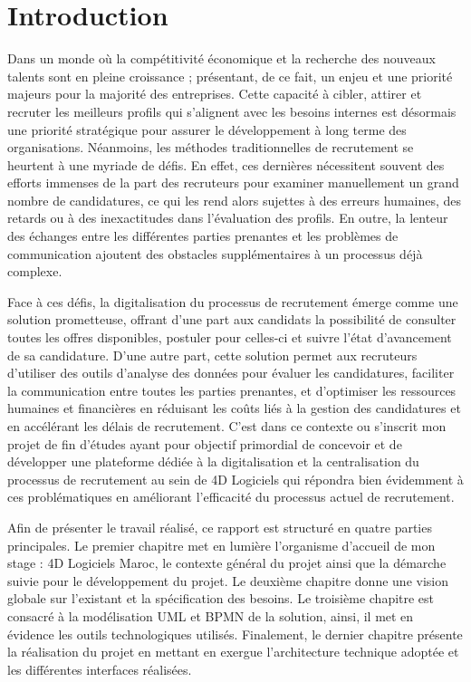 \chapter*{Introduction}
Dans un monde où la compétitivité économique et la recherche des nouveaux talents
sont en pleine croissance ; présentant, de ce fait, un enjeu et une priorité majeurs pour la
majorité des entreprises. Cette capacité à cibler, attirer et recruter les meilleurs profils qui
s’alignent avec les besoins internes est désormais une priorité stratégique pour assurer le
développement à long terme des organisations. Néanmoins, les méthodes traditionnelles de
recrutement se heurtent à une myriade de défis. En effet, ces dernières nécessitent souvent
des efforts immenses de la part des recruteurs pour examiner manuellement un grand
nombre de candidatures, ce qui les rend alors sujettes à des erreurs humaines, des retards
ou à des inexactitudes dans l’évaluation des profils. En outre, la lenteur des échanges entre
les différentes parties prenantes et les problèmes de communication ajoutent des obstacles
supplémentaires à un processus déjà complexe.
\newline

Face à ces défis, la digitalisation du processus de recrutement émerge comme une
solution prometteuse, offrant d’une part aux candidats la possibilité de consulter toutes les
offres disponibles, postuler pour celles-ci et suivre l’état d’avancement de sa candidature.
D’une autre part, cette solution permet aux recruteurs d’utiliser des outils d’analyse des
données pour évaluer les candidatures, faciliter la communication entre toutes les parties
prenantes, et d’optimiser les ressources humaines et financières en réduisant les coûts
liés à la gestion des candidatures et en accélérant les délais de recrutement. C’est dans
ce contexte ou s’inscrit mon projet de fin d’études ayant pour objectif primordial de
concevoir et de développer une plateforme dédiée à la digitalisation et la centralisation
du processus de recrutement au sein de 4D Logiciels qui répondra bien évidemment à ces
problématiques en améliorant l’efficacité du processus actuel de recrutement.  
\newline

Afin de présenter le travail réalisé, ce rapport est structuré en quatre parties principales. 
Le premier chapitre met en lumière l’organisme d’accueil de mon stage : 4D Logiciels Maroc,
 le contexte général du projet ainsi que la démarche suivie pour le développement
du projet. Le deuxième chapitre donne une vision globale sur l’existant et la spécification
des besoins. Le troisième chapitre est consacré à la modélisation UML et BPMN de la
solution, ainsi, il met en évidence les outils technologiques utilisés. Finalement, le dernier
chapitre présente la réalisation du projet en mettant en exergue l’architecture technique
adoptée et les différentes interfaces réalisées.
